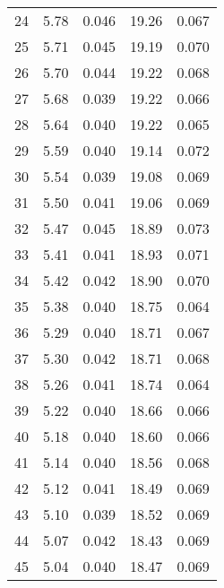 \begin{table}
\begin{tabular}{c|ll|ll}
24 & 5.78 & 0.046 & 19.26 & 0.067 \\
25 & 5.71 & 0.045 & 19.19 & 0.070 \\
26 & 5.70 & 0.044 & 19.22 & 0.068 \\
27 & 5.68 & 0.039 & 19.22 & 0.066 \\
28 & 5.64 & 0.040 & 19.22 & 0.065 \\
29 & 5.59 & 0.040 & 19.14 & 0.072 \\
30 & 5.54 & 0.039 & 19.08 & 0.069 \\
31 & 5.50 & 0.041 & 19.06 & 0.069 \\
32 & 5.47 & 0.045 & 18.89 & 0.073 \\
33 & 5.41 & 0.041 & 18.93 & 0.071 \\
34 & 5.42 & 0.042 & 18.90 & 0.070 \\
35 & 5.38 & 0.040 & 18.75 & 0.064 \\
36 & 5.29 & 0.040 & 18.71 & 0.067 \\
37 & 5.30 & 0.042 & 18.71 & 0.068 \\
38 & 5.26 & 0.041 & 18.74 & 0.064 \\
39 & 5.22 & 0.040 & 18.66 & 0.066 \\
40 & 5.18 & 0.040 & 18.60 & 0.066 \\
41 & 5.14 & 0.040 & 18.56 & 0.068 \\
42 & 5.12 & 0.041 & 18.49 & 0.069 \\
43 & 5.10 & 0.039 & 18.52 & 0.069 \\
44 & 5.07 & 0.042 & 18.43 & 0.069 \\
45 & 5.04 & 0.040 & 18.47 & 0.069 \\
               \hline
        \end{tabular}
    \end{table}
    \clearpage

